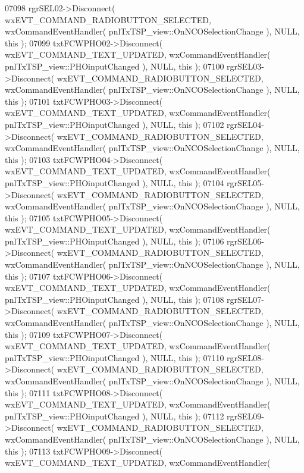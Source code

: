 \begin{DoxyCode}
07098     rgrSEL02->Disconnect( wxEVT\_COMMAND\_RADIOBUTTON\_SELECTED, wxCommandEventHandler( 
      pnlTxTSP_view::OnNCOSelectionChange ), NULL, \textcolor{keyword}{this} );
07099     txtFCWPHO02->Disconnect( wxEVT\_COMMAND\_TEXT\_UPDATED, wxCommandEventHandler( 
      pnlTxTSP_view::PHOinputChanged ), NULL, \textcolor{keyword}{this} );
07100     rgrSEL03->Disconnect( wxEVT\_COMMAND\_RADIOBUTTON\_SELECTED, wxCommandEventHandler( 
      pnlTxTSP_view::OnNCOSelectionChange ), NULL, \textcolor{keyword}{this} );
07101     txtFCWPHO03->Disconnect( wxEVT\_COMMAND\_TEXT\_UPDATED, wxCommandEventHandler( 
      pnlTxTSP_view::PHOinputChanged ), NULL, \textcolor{keyword}{this} );
07102     rgrSEL04->Disconnect( wxEVT\_COMMAND\_RADIOBUTTON\_SELECTED, wxCommandEventHandler( 
      pnlTxTSP_view::OnNCOSelectionChange ), NULL, \textcolor{keyword}{this} );
07103     txtFCWPHO04->Disconnect( wxEVT\_COMMAND\_TEXT\_UPDATED, wxCommandEventHandler( 
      pnlTxTSP_view::PHOinputChanged ), NULL, \textcolor{keyword}{this} );
07104     rgrSEL05->Disconnect( wxEVT\_COMMAND\_RADIOBUTTON\_SELECTED, wxCommandEventHandler( 
      pnlTxTSP_view::OnNCOSelectionChange ), NULL, \textcolor{keyword}{this} );
07105     txtFCWPHO05->Disconnect( wxEVT\_COMMAND\_TEXT\_UPDATED, wxCommandEventHandler( 
      pnlTxTSP_view::PHOinputChanged ), NULL, \textcolor{keyword}{this} );
07106     rgrSEL06->Disconnect( wxEVT\_COMMAND\_RADIOBUTTON\_SELECTED, wxCommandEventHandler( 
      pnlTxTSP_view::OnNCOSelectionChange ), NULL, \textcolor{keyword}{this} );
07107     txtFCWPHO06->Disconnect( wxEVT\_COMMAND\_TEXT\_UPDATED, wxCommandEventHandler( 
      pnlTxTSP_view::PHOinputChanged ), NULL, \textcolor{keyword}{this} );
07108     rgrSEL07->Disconnect( wxEVT\_COMMAND\_RADIOBUTTON\_SELECTED, wxCommandEventHandler( 
      pnlTxTSP_view::OnNCOSelectionChange ), NULL, \textcolor{keyword}{this} );
07109     txtFCWPHO07->Disconnect( wxEVT\_COMMAND\_TEXT\_UPDATED, wxCommandEventHandler( 
      pnlTxTSP_view::PHOinputChanged ), NULL, \textcolor{keyword}{this} );
07110     rgrSEL08->Disconnect( wxEVT\_COMMAND\_RADIOBUTTON\_SELECTED, wxCommandEventHandler( 
      pnlTxTSP_view::OnNCOSelectionChange ), NULL, \textcolor{keyword}{this} );
07111     txtFCWPHO08->Disconnect( wxEVT\_COMMAND\_TEXT\_UPDATED, wxCommandEventHandler( 
      pnlTxTSP_view::PHOinputChanged ), NULL, \textcolor{keyword}{this} );
07112     rgrSEL09->Disconnect( wxEVT\_COMMAND\_RADIOBUTTON\_SELECTED, wxCommandEventHandler( 
      pnlTxTSP_view::OnNCOSelectionChange ), NULL, \textcolor{keyword}{this} );
07113     txtFCWPHO09->Disconnect( wxEVT\_COMMAND\_TEXT\_UPDATED, wxCommandEventHandler( 

\end{DoxyCode}
